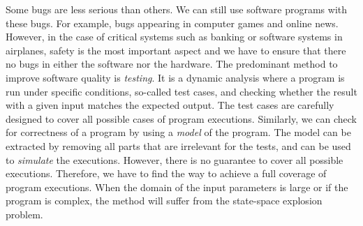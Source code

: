 %
%
%
Some bugs are less serious than others. We can still use software programs with these bugs. For example, bugs appearing in computer games and online news. However, in the case of critical systems such as banking or software systems in airplanes, safety is the most important aspect and we have to ensure that there no bugs in either the software nor the hardware.
%
The predominant method to improve software quality is
\emph{testing}. It is a dynamic analysis where a program is run under specific conditions, so-called test cases, and checking
whether the result with a given input matches the expected output.
%
The test cases are carefully designed to cover all possible cases of program executions.
%
Similarly, we can check for correctness of a program by using a \emph{model} of the program. The model can be extracted by
removing all parts that are irrelevant for the tests, and can be used
to \emph{simulate} the executions. However, there is no guarantee to cover all possible executions. Therefore, we have to find the way to achieve a full coverage of program executions. When the domain of the input parameters is large or if the program is
complex, the method will suffer from the state-space explosion
problem.%
%




%
\newpage
%

